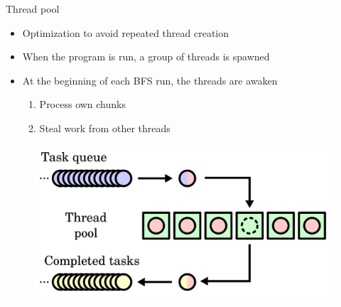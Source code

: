 \begin{frame}{Thread pool}
\begin{itemize}
  \item Optimization to avoid repeated thread creation
  \item When the program is run, a group of threads is spawned
  \item At the beginning of each BFS run, the threads are awaken
  \begin{enumerate}
    \item Process own chunks
    \item Steal work from other threads
  \end{enumerate}
\end{itemize}
\begin{figure}
  \centering
  \includegraphics[width=0.5\linewidth]{images/Thread_pool.png}
\end{figure}
\end{frame}
